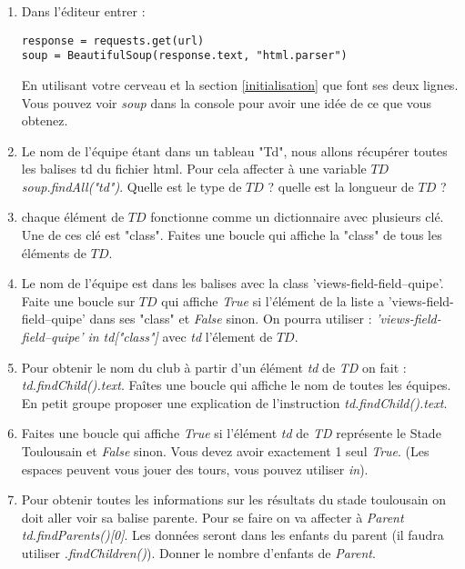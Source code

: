 \documentclass[12pt,fleqn]{article} %
\begin{document}
\begin{exercise}
\begin{enumerate}
	\item Dans l'éditeur entrer : 
\begin{center}
	\begin{varwidth}[t]{.5\textwidth}
		\begin{lstlisting}[language=iPython,linewidth = 13cm]	
response = requests.get(url)
soup = BeautifulSoup(response.text, "html.parser")
\end{lstlisting}\end{varwidth}\end{center}
	En utilisant votre cerveau et la section \ref{initialisation} que font ses deux lignes. Vous pouvez voir \textit{soup} dans la console pour avoir une idée de ce que vous obtenez.
	\item Le nom de l'équipe étant dans un tableau "Td", nous allons récupérer toutes les balises td du fichier html. Pour cela affecter à une variable $TD$ \textit{soup.findAll("td")}. Quelle est le type de $TD$ ? quelle est la longueur de $TD$ ?
	\item chaque élément de $TD$ fonctionne comme un dictionnaire avec plusieurs clé. Une de ces clé est "class". Faites une boucle qui affiche la "class" de tous les éléments de $TD$.
	\item Le nom de l'équipe est dans les balises avec la class 'views-field-field--quipe'. Faite une boucle sur $TD$ qui affiche \textit{True} si l'élément de la liste a 'views-field-field--quipe' dans ses "class" et \textit{False} sinon. On pourra utiliser : \textit{'views-field-field--quipe' in td["class"]}	avec \textit{td} l'élement de $TD$. 
	\item Pour obtenir le nom du club à partir d'un élément \textit{td} de \textit{TD} on fait : \textit{td.findChild().text}. Faîtes une boucle qui affiche le nom de toutes les équipes. En petit groupe proposer une explication de l'instruction \textit{td.findChild().text}.
	\item Faites une boucle qui affiche \textit{True} si l'élément \textit{td} de \textit{TD} représente le Stade Toulousain et \textit{False} sinon. Vous devez avoir exactement 1 seul \textit{True}. (Les espaces peuvent vous jouer des tours, vous pouvez utiliser \textit{in}).
	\item Pour obtenir toutes les informations sur les résultats du stade toulousain on doit aller voir sa balise parente. Pour se faire on va affecter à \textit{Parent} \textit{td.findParents()[0]}. Les données seront dans les enfants du parent (il faudra utiliser \textit{.findChildren()}). Donner le nombre d'enfants de \textit{Parent}.

\end{enumerate}
\end{exercise}
\end{document}
